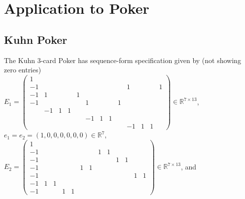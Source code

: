 \documentclass[a4paper,9pt,journal]{IEEEtran}
\begin{document}
\section{Application to Poker}
\subsection{Kuhn Poker}
The Kuhn 3-card Poker has sequence-form specification given by (not showing zero entries)\\
$E_1 = \left(\begin{array}{ccccccccccccc}
1 &   &   &   &   &   &   &   &   &   &   &   &  \\
-1 &   &   &   &   &   &   &   &   & 1 &   &   & 1\\
-1 & 1 &   &   & 1 &   &   &   &   &   &   &   &  \\
-1 &   &   &   &   & 1 &   &   & 1 &   &   &   &  \\
  & -1 & 1 & 1 &   &   &   &   &   &   &   &   &  \\
  &   &   &   &   & -1 & 1 & 1 &   &   &   &   &  \\
  &   &   &   &   &   &   &   &   & -1 & 1 & 1 &  
\end{array}\right)  \in \mathbb{R}^{7 \times 13}$, $e_1 = e_2 = (1, 0, 0, 0, 0, 0, 0) \in \mathbb{R}^7$,\\
$E_2 = \left(\begin{array}{ccccccccccccc}
1 &   &   &   &   &   &   &   &   &   &   &   &  \\
-1 &   &   &   &   &   &   & 1 & 1 &   &   &   &  \\
-1 &   &   &   &   &   &   &   &   & 1 & 1 &   &  \\
-1 &   &   &   &   & 1 & 1 &   &   &   &   &   &  \\
-1 &   &   &   &   &   &   &   &   &   &   & 1 & 1\\
-1 & 1 & 1 &   &   &   &   &   &   &   &   &   &  \\
-1 &   &   & 1 & 1 &   &   &   &   &   &   &   &  
\end{array}\right)  \in \mathbb{R}^{7 \times 13}$, and\\
\end{document}
